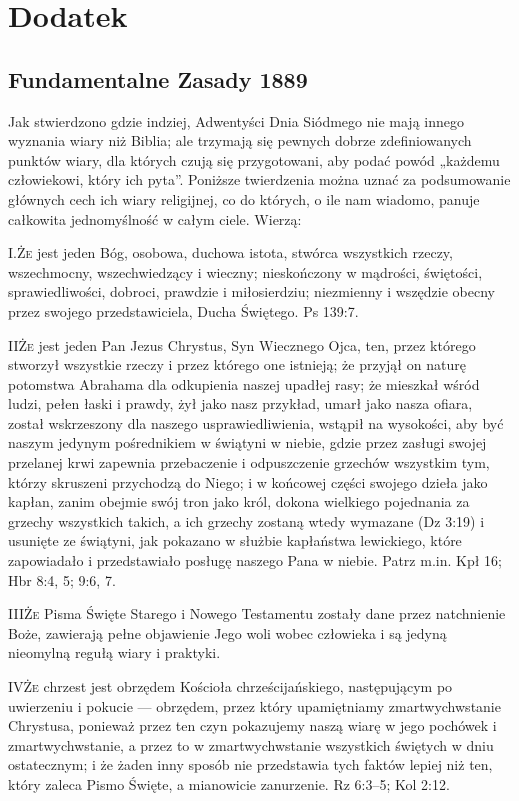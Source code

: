 \chapter*{Dodatek} \label{chap:appendix} 

\section*{Fundamentalne Zasady 1889}

Jak stwierdzono gdzie indziej, Adwentyści Dnia Siódmego nie mają innego wyznania wiary niż Biblia; ale trzymają się pewnych dobrze zdefiniowanych punktów wiary, dla których czują się przygotowani, aby podać powód „każdemu człowiekowi, który ich pyta”. Poniższe twierdzenia można uznać za podsumowanie głównych cech ich wiary religijnej, co do których, o ile nam wiadomo, panuje całkowita jednomyślność w całym ciele. Wierzą:

\lettrine{I.}{Że} jest jeden Bóg, osobowa, duchowa istota, stwórca wszystkich rzeczy, wszechmocny, wszechwiedzący i wieczny; nieskończony w mądrości, świętości, sprawiedliwości, dobroci, prawdzie i miłosierdziu; niezmienny i wszędzie obecny przez swojego przedstawiciela, Ducha Świętego. Ps 139:7.

\lettrine{II}{Że} jest jeden Pan Jezus Chrystus, Syn Wiecznego Ojca, ten, przez którego stworzył wszystkie rzeczy i przez którego one istnieją; że przyjął on naturę potomstwa Abrahama dla odkupienia naszej upadłej rasy; że mieszkał wśród ludzi, pełen łaski i prawdy, żył jako nasz przykład, umarł jako nasza ofiara, został wskrzeszony dla naszego usprawiedliwienia, wstąpił na wysokości, aby być naszym jedynym pośrednikiem w świątyni w niebie, gdzie przez zasługi swojej przelanej krwi zapewnia przebaczenie i odpuszczenie grzechów wszystkim tym, którzy skruszeni przychodzą do Niego; i w końcowej części swojego dzieła jako kapłan, zanim obejmie swój tron jako król, dokona wielkiego pojednania za grzechy wszystkich takich, a ich grzechy zostaną wtedy wymazane (Dz 3:19) i usunięte ze świątyni, jak pokazano w służbie kapłaństwa lewickiego, które zapowiadało i przedstawiało posługę naszego Pana w niebie. Patrz m.in. Kpł 16; Hbr 8:4, 5; 9:6, 7.

\lettrine{III}{Że} Pisma Święte Starego i Nowego Testamentu zostały dane przez natchnienie Boże, zawierają pełne objawienie Jego woli wobec człowieka i są jedyną nieomylną regułą wiary i praktyki.

\lettrine{IV}{Że} chrzest jest obrzędem Kościoła chrześcijańskiego, następującym po uwierzeniu i pokucie — obrzędem, przez który upamiętniamy zmartwychwstanie Chrystusa, ponieważ przez ten czyn pokazujemy naszą wiarę w jego pochówek i zmartwychwstanie, a przez to w zmartwychwstanie wszystkich świętych w dniu ostatecznym; i że żaden inny sposób nie przedstawia tych faktów lepiej niż ten, który zaleca Pismo Święte, a mianowicie zanurzenie. Rz 6:3--5; Kol 2:12.

